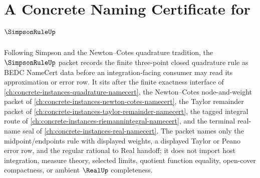 \chapter{A Concrete Naming Certificate for $\SimpsonRuleUp$}
\label{ch:concrete-instances-simpson-rule-namecert}

Following Simpson and the Newton--Cotes quadrature tradition, the $\SimpsonRuleUp$ packet records the finite three-point closed quadrature rule as BEDC NameCert data before an integration-facing consumer may read its approximation or error row. It sits after the finite exactness interface of \autoref{ch:concrete-instances-quadrature-namecert}, the Newton--Cotes node-and-weight packet of \autoref{ch:concrete-instances-newton-cotes-namecert}, the Taylor remainder packet of \autoref{ch:concrete-instances-taylor-remainder-namecert}, the tagged integral route of \autoref{ch:concrete-instances-riemannintegral-namecert}, and the terminal real-name seal of \autoref{ch:concrete-instances-real-namecert}. The packet names only the midpoint/endpoints rule with displayed weights, a displayed Taylor or Peano error row, and the regular rational to Real handoff; it does not import host integration, measure theory, selected limits, quotient function equality, open-cover compactness, or ambient $\RealUp$ completeness.

